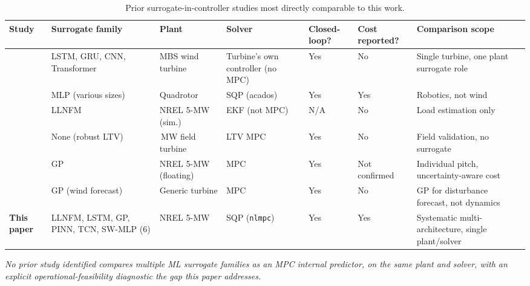 \begin{table}[H]
	\centering
	\caption{Prior surrogate-in-controller studies most directly comparable
		to this work.}
	\label{tab:prior_studies}
	\small
	\setlength{\tabcolsep}{3pt}
	\begin{tabularx}{\textwidth}{
			>{\raggedright\arraybackslash}p{1.8cm}
			>{\raggedright\arraybackslash}p{2.1cm}
			>{\raggedright\arraybackslash}X
			>{\raggedright\arraybackslash}p{2.0cm}
			>{\centering\arraybackslash}p{1cm}
			>{\centering\arraybackslash}p{1.5cm}
			>{\raggedright\arraybackslash}X
		}
		\toprule
		Study & Surrogate family & Plant & Solver &
		Closed-loop? & Cost reported? & Comparison scope \\
		\midrule
		
		\citet{witter_creating_2025}
		& LSTM, GRU, CNN, Transformer
		& MBS wind turbine
		& Turbine's own controller (no MPC)
		& Yes
		& No
		& Single turbine, one plant surrogate role \\
		
		\citet{salzmann_real-time_2022}
		& MLP (various sizes)
		& Quadrotor
		& SQP (acados)
		& Yes
		& Yes
		& Robotics, not wind \\
		
		\citet{klein2024}
		& LLNFM
		& NREL 5-MW (sim.)
		& EKF (not MPC)
		& N/A
		& No
		& Load estimation only \\
		
		\citet{klein2025}
		& None (robust LTV)
		& 3\,MW field turbine
		& LTV MPC
		& Yes
		& No
		& Field validation, no surrogate \\
		
		\citet{fu_gaussian_2025}
		& GP
		& NREL 5-MW (floating)
		& MPC
		& Yes
		& Not confirmed
		& Individual pitch, uncertainty-aware cost \\
		
		\citet{liu_wind_2018}
		& GP (wind forecast)
		& Generic turbine
		& MPC
		& Yes
		& No
		& GP for disturbance forecast, not dynamics \\
		
		\textbf{This paper}
		& LLNFM, LSTM, GP, PINN, TCN, SW-MLP (6)
		& NREL 5-MW
		& SQP (\texttt{nlmpc})
		& Yes
		& Yes
		& Systematic multi-architecture, single plant/solver \\
		
		\bottomrule
	\end{tabularx}
	
	\vspace{4pt}
	{\footnotesize
		\textit{No prior study identified compares multiple ML surrogate
			families as an MPC internal predictor, on the same plant and solver,
			with an explicit operational-feasibility diagnostic  the gap this
			paper addresses.}
	}
\end{table}


